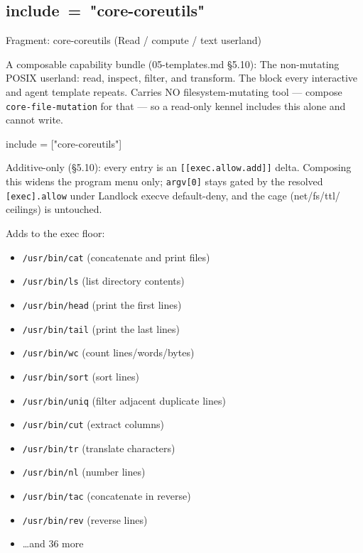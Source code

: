 \hypertarget{include-core-coreutils}{%
\subsection{\texorpdfstring{include\ =\ "core-coreutils"}{include = "core-coreutils"}}\label{include-core-coreutils}}

Fragment: core-coreutils (Read / compute / text userland)

A composable capability bundle (05-templates.md §5.10): The non-mutating
POSIX userland: read, inspect, filter, and transform. The block every
interactive and agent template repeats. Carries NO filesystem-mutating
tool --- compose \texttt{core-file-mutation} for that --- so a read-only
kennel includes this alone and cannot write.

\begin{kennelcode}
include = ["core-coreutils"]
\end{kennelcode}

Additive-only (§5.10): every entry is an
\texttt{{[}{[}exec.allow.add{]}{]}} delta. Composing this widens the
program menu only; \texttt{argv{[}0{]}} stays gated by the resolved
\texttt{{[}exec{]}.allow} under Landlock execve default-deny, and the
cage (net/fs/ttl/ ceilings) is untouched.

Adds to the exec floor:

\begin{itemize}
\tightlist
\item
  \texttt{/usr/bin/cat} (concatenate and print files)
\item
  \texttt{/usr/bin/ls} (list directory contents)
\item
  \texttt{/usr/bin/head} (print the first lines)
\item
  \texttt{/usr/bin/tail} (print the last lines)
\item
  \texttt{/usr/bin/wc} (count lines/words/bytes)
\item
  \texttt{/usr/bin/sort} (sort lines)
\item
  \texttt{/usr/bin/uniq} (filter adjacent duplicate lines)
\item
  \texttt{/usr/bin/cut} (extract columns)
\item
  \texttt{/usr/bin/tr} (translate characters)
\item
  \texttt{/usr/bin/nl} (number lines)
\item
  \texttt{/usr/bin/tac} (concatenate in reverse)
\item
  \texttt{/usr/bin/rev} (reverse lines)
\item
  \ldots and 36 more
\end{itemize}

